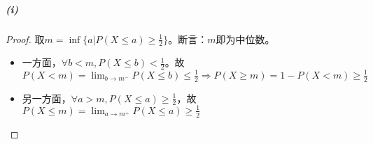\message{ !name(2.tex)}\documentclass{ctexart}
\begin{document}
\subparagraph{(i)}
\begin{proof}
  取$m=\inf\{a|P(X\leq a)\geq \frac{1}{2}\}$。断言：$m$即为中位数。
  \begin{itemize}
  \item 一方面，$\forall b<m, P(X\leq b)<\frac{1}{2}$。故$P(X< m)=\lim_{b\to m^{-}}P(X\leq b)\leq \frac{1}{2}\Rightarrow P(X\geq m)=1-P(X<m)\geq \frac{1}{2}$
  \item 另一方面，$\forall a>m, P(X\leq a)\geq\frac{1}{2}$，故$P(X\leq m)=\lim_{a\to m^{+}}P(X\leq a)\geq\frac{1}{2}$
  \end{itemize}
\end{proof}

\end{document}
